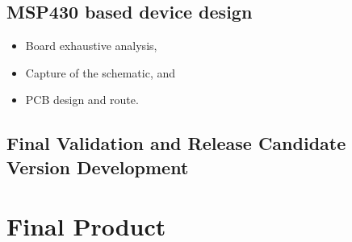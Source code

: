 		\subsection{MSP430 based device design}
		\begin{itemize}
		\item Board exhaustive analysis,
		\item Capture of the schematic, and
		\item PCB design and route.
		\end{itemize}

		\subsection{Final Validation and Release Candidate Version Development}

		\section{Final Product}
